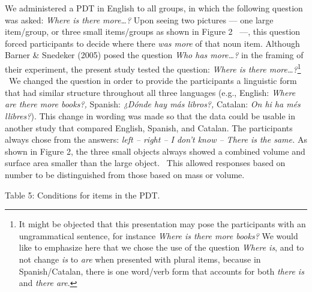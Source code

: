 \documentclass[12pt]{article}
\newcommand\textstylefootnotereference[1]{{\fontsize{6.5pt}{7.8pt}\selectfont #1}}
\newenvironment{styleStandard}{\setlength\leftskip{0cm}\setlength\rightskip{0cm plus 1fil}\setlength\parindent{0cm}\setlength\parfillskip{0pt plus 1fil}\setlength\parskip{0in plus 1pt}\writerlistparindent\writerlistleftskip\leavevmode\normalfont\normalsize\writerlistlabel\ignorespaces}{\unskip\vspace{0.111in plus 0.0111in}\par}
\newcommand\writerlistleftskip{}
\newcommand\writerlistparindent{}
\newcommand\writerlistlabel{}
\begin{document}
\begin{styleStandard}
We administered a PDT in English to all groups, in which the following question was asked: \textit{Where is there more…?} Upon seeing two pictures — one large item/group, or three small items/groups as shown in Figure 2 \ —, this question forced participants to decide where there \textit{was more} of that noun item. Although Barner \& Snedeker (2005) posed the question \textit{Who has more…?} in the framing of their experiment, the present study tested the question: \textit{Where is there more…?}\footnote{\textstylefootnotereference{ }It might be objected that this presentation may pose the participants with an ungrammatical sentence, for instance \textit{Where is there more books?} We would like to emphasize here that we chose the use of the question \textit{Where is}, and to not change \textit{is} to \textit{are }when presented with plural items, because in Spanish/Catalan, there is one word/verb form that accounts for both \textit{there is} and \textit{there are}.} \ We changed the question in order to provide the participants a linguistic form that had similar structure throughout all three languages (e.g., English: \textit{Where are there more books?, }Spanish: \textit{¿Dónde hay más libros?, }Catalan: \textit{On hi ha més llibres?}). This change in wording was made so that the data could be usable in another study that compared English, Spanish, and Catalan. The participants always chose from the answers: \textit{left – right – I don’t know – There is the same.} As shown in Figure 2, the three small objects always showed a combined volume and surface area smaller than the large object. \ This allowed responses based on number to be distinguished from those based on mass or volume. 
\end{styleStandard}

\begin{styleStandard}
Table 5: Conditions for items in the PDT.
\end{styleStandard}
\end{document}
